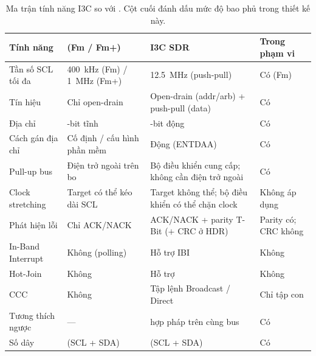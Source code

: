 \begin{table}[!htb]\centering
  \caption{Ma trận tính năng I3C so với \iic{}. Cột cuối đánh dấu mức độ bao phủ trong thiết kế này.}
  \label{tab:i3c-vs-i2c}
  \small
  \begin{tabular}{@{}>{\raggedright\arraybackslash}p{}
                     >{\raggedright\arraybackslash}p{}
                     >{\raggedright\arraybackslash}p{}
                     >{\raggedright\arraybackslash}p{}@{}}
    \toprule
    \textbf{Tính năng} & \textbf{\iic{} (Fm / Fm+)} & \textbf{I3C SDR} & \textbf{Trong phạm vi} \\
    \midrule
    Tần số SCL tối đa   & \SI{400}{\kilo\hertz} (Fm) / \SI{1}{\mega\hertz} (Fm+) & \SI{12.5}{\mega\hertz} (push-pull) & Có (Fm) \\
    Tín hiệu            & Chỉ open-drain             & Open-drain (addr/arb) + push-pull (data) & Có \\
    Địa chỉ             & 7-bit tĩnh                 & 7-bit động               & Có \\
    Cách gán địa chỉ    & Cố định / cấu hình phần mềm & Động (ENTDAA)            & Có \\
    Pull-up bus         & Điện trở ngoài trên bo     & Bộ điều khiển cung cấp; không cần điện trở ngoài & Có \\
    Clock stretching    & Target có thể kéo dài SCL  & Target không thể; bộ điều khiển có thể chặn clock & Không áp dụng \\
    Phát hiện lỗi       & Chỉ ACK/NACK               & ACK/NACK + parity T-Bit ($+$ CRC ở HDR) & Parity có; CRC không \\
    In-Band Interrupt   & Không (polling)            & Hỗ trợ IBI               & Không \\
    Hot-Join            & Không                      & Hỗ trợ                   & Không \\
    CCC                 & Không                      & Tập lệnh Broadcast / Direct & Chỉ tập con \\
    Tương thích ngược   & ---                        & \iic{} hợp pháp trên cùng bus & Có \\
    Số dây              & 2 (SCL + SDA)              & 2 (SCL + SDA)            & Có \\
    \bottomrule
  \end{tabular}
\end{table}

